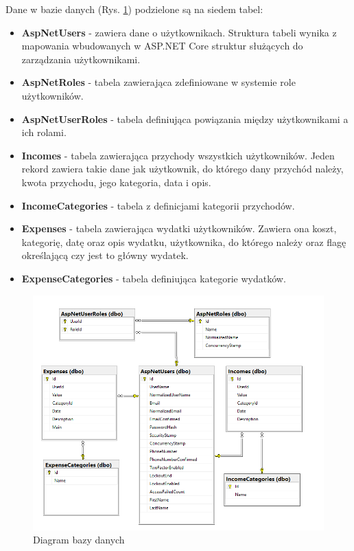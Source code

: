 Dane w bazie danych (Rys. \ref{db_diagram}) podzielone są na siedem tabel:
\begin{itemize}
	\item\textbf{AspNetUsers} - zawiera dane o użytkownikach. Struktura tabeli wynika z mapowania wbudowanych w ASP.NET Core struktur służących do zarządzania użytkownikami.
	\item\textbf{AspNetRoles} - tabela zawierająca zdefiniowane w systemie role użytkowników.
	\item\textbf{AspNetUserRoles} - tabela definiująca powiązania między użytkownikami a ich rolami.
	\item\textbf{Incomes} - tabela zawierająca przychody wszystkich użytkowników. Jeden rekord zawiera takie dane jak użytkownik, do którego dany przychód należy, kwota przychodu, jego kategoria, data i opis.
	\item\textbf{IncomeCategories} - tabela z definicjami kategorii przychodów.
	\item\textbf{Expenses} - tabela zawierająca wydatki użytkowników. Zawiera ona koszt, kategorię, datę oraz opis wydatku, użytkownika, do którego należy oraz flagę określającą czy jest to główny wydatek.
	\item\textbf{ExpenseCategories} - tabela definiująca kategorie wydatków.
\end{itemize}
\begin{figure}[!ht]
	\begin{center}
		\includegraphics[width=6in]{img/diagram/db_diagram.png}
		\caption{Diagram bazy danych}
		\label{db_diagram}
	\end{center}
\end{figure}

